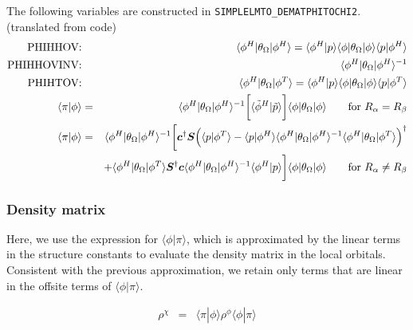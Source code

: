 \documentclass[11pt,a4paper]{report}
\begin{document}
The following variables are constructed in \verb|SIMPLELMTO_DEMATPHITOCHI2|.
(translated from code)
\begin{eqnarray}
\text{PHIHHOV:} && 
\langle\phi^H|\theta_\Omega|\phi^H\rangle
=\langle\phi^H|p\rangle
\langle\phi|\theta_\Omega|\phi\rangle
\langle{p}|\phi^H\rangle
\nonumber\\
%
\text{PHIHHOVINV:} && \langle\phi^H|\theta_\Omega|\phi^H\rangle^{-1}
\nonumber\\
%
\text{PHIHTOV:} && \langle\phi^H|\theta_\Omega|\phi^T\rangle
=\langle\phi^H|p\rangle
\langle\phi|\theta_\Omega|\phi\rangle
\langle{p}|\phi^T\rangle
\nonumber\\
%
\langle\pi|\phi\rangle&=&
\langle\phi^H|\theta_\Omega|\phi^H\rangle^{-1}
\biggl[
\langle\tilde{\phi}^H|\tilde{p}\rangle
\biggr] \langle\phi|\theta_\Omega|\phi\rangle
\qquad\text{for $R_\alpha=R_\beta$}
\nonumber\\
%
%
\langle\pi|\phi\rangle&=&
\langle\phi^H|\theta_\Omega|\phi^H\rangle^{-1}
\biggl[
\mat{c}^\dagger\mat{S}
\Bigl(
\langle{p}|\phi^T\rangle
-\langle{p}|\phi^H\rangle
\langle\phi^H|\theta_\Omega|\phi^H\rangle^{-1}
\langle\phi^H|\theta_\Omega|\phi^T\rangle\Bigr)^\dagger
\nonumber\\
&&+
\langle\phi^H|\theta_\Omega|\phi^T\rangle\mat{S}^\dagger\mat{c}
\langle\phi^H|\theta_\Omega|\phi^H\rangle^{-1}
\langle\phi^H|{p}\rangle
\biggr] \langle\phi|\theta_\Omega|\phi\rangle
\qquad\text{for $R_\alpha\neq R_\beta$}
\end{eqnarray}


\subsubsection{Density matrix}
Here, we use the expression for $\langle\phi|\pi\rangle$, which is
approximated by the linear terms in the structure constants to
evaluate the density matrix in the local orbitals. Consistent with the
previous approximation, we retain only terms that are linear in the
offsite terms of $\langle\phi|\pi\rangle$.

\begin{eqnarray}
\rho^\chi&=&\langle\pi|\phi\rangle\rho^\phi\langle\phi|\pi\rangle
\end{eqnarray}
\end{document}
